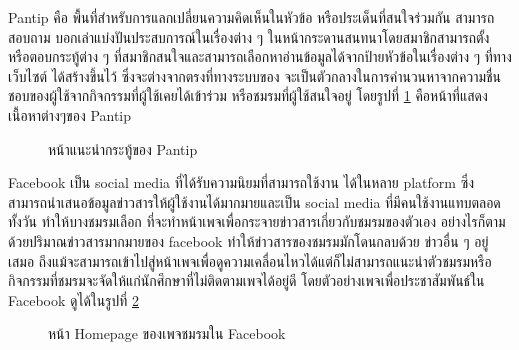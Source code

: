 \documentclass[14pt,oneside,openright,a4paper]{cpe-thai-project}
\begin{document}
Pantip คือ พื้นที่สำหรับการแลกเปลี่ยนความคิดเห็นในหัวข้อ หรือประเด็นที่สนใจร่วมกัน สามารถสอบถาม บอกเล่าแบ่งปันประสบการณ์ในเรื่องต่าง ๆ ในหน้ากระดานสนทนาโดยสมาชิกสามารถตั้ง หรือตอบกระทู้ต่าง ๆ ที่สมาชิกสนใจและสามารถเลือกหาอ่านข้อมูลได้จากป้ายหัวข้อในเรื่องต่าง ๆ ที่ทางเว็บไซต์ ได้สร้างขึ้นไว้ ซึ่งจะต่างจากตรงที่ทางระบบของ จะเป็นตัวกลางในการคำนวนหาจากความชื่นชอบของผู้ใช้จากกิจกรรมที่ผู้ใช้เคยได้เข้าร่วม หรือชมรมที่ผู้ใช้สนใจอยู่ โดยรูปที่ \ref{fig:pantip} คือหน้าที่แสดงเนื้อหาต่างๆของ Pantip

  \begin{figure}[!h]\centering
    \setlength{\fboxrule}{0.5mm} %
    \setlength{\fboxsep}{0.5cm}
    \caption{หน้าแนะนำกระทู้ของ Pantip}\label{fig:pantip}
    \end{figure}

Facebook เป็น social media ที่ได้รับความนิยมที่สามารถใช้งาน ได้ในหลาย platform ซึ่งสามารถนำเสนอข้อมูลข่าวสารให้ผู้ใช้งานได้มากมายและเป็น social media ที่มีคนใช้งานแทบตลอดทั้งวัน ทำให้บางชมรมเลือก
ที่จะทำหน้าเพจเพื่อกระจายข่าวสารเกี่ยวกับชมรมของตัวเอง อย่างไรก็ตามด้วยปริมาณข่าวสารมากมายของ facebook ทำให้ข่าวสารของชมรมมักโดนกลบด้วย  ข่าวอื่น ๆ อยู่เสมอ ถึงแม้จะสามารถเข้าไปสู่หน้าเพจเพื่อดูความเคลื่อนไหวได้แต่ก็ไม่สามารถแนะนำตัวชมรมหรือกิจกรรมที่ชมรมจะจัดให้แก่นักศึกษาที่ไม่ติดตามเพจได้อยู่ดี โดยตัวอย่างเพจเพื่อประชาสัมพันธ์ใน Facebook ดูได้ในรูปที่ \ref{fig:facebook}

  \begin{figure}[!h]\centering
    \setlength{\fboxrule}{0.5mm} %
    \setlength{\fboxsep}{0.5cm}
    \caption{หน้า Homepage ของเพจชมรมใน Facebook}\label{fig:facebook}
    \end{figure}
\end{document}
